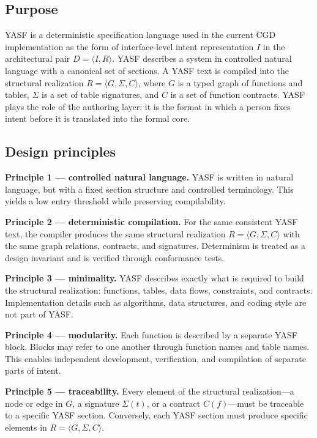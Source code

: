 \subsection{Purpose}

YASF is a deterministic specification language used in the current CGD implementation as the form of interface-level intent representation $I$ in the architectural pair $D = \langle I, R \rangle$. YASF describes a system in controlled natural language with a canonical set of sections. A YASF text is compiled into the structural realization $R = \langle G, \Sigma, C \rangle$, where $G$ is a typed graph of functions and tables, $\Sigma$ is a set of table signatures, and $C$ is a set of function contracts. YASF plays the role of the authoring layer: it is the format in which a person fixes intent before it is translated into the formal core.

\subsection{Design principles}

\textbf{Principle 1 --- controlled natural language.} YASF is written in natural language, but with a fixed section structure and controlled terminology. This yields a low entry threshold while preserving compilability.

\textbf{Principle 2 --- deterministic compilation.} For the same consistent YASF text, the compiler produces the same structural realization $R = \langle G, \Sigma, C \rangle$ with the same graph relations, contracts, and signatures. Determinism is treated as a design invariant and is verified through conformance tests.

\textbf{Principle 3 --- minimality.} YASF describes exactly what is required to build the structural realization: functions, tables, data flows, constraints, and contracts. Implementation details such as algorithms, data structures, and coding style are not part of YASF.

\textbf{Principle 4 --- modularity.} Each function is described by a separate YASF block. Blocks may refer to one another through function names and table names. This enables independent development, verification, and compilation of separate parts of intent.

\textbf{Principle 5 --- traceability.} Every element of the structural realization---a node or edge in $G$, a signature $\Sigma(t)$, or a contract $C(f)$---must be traceable to a specific YASF section. Conversely, each YASF section must produce specific elements in $R = \langle G, \Sigma, C \rangle$.

